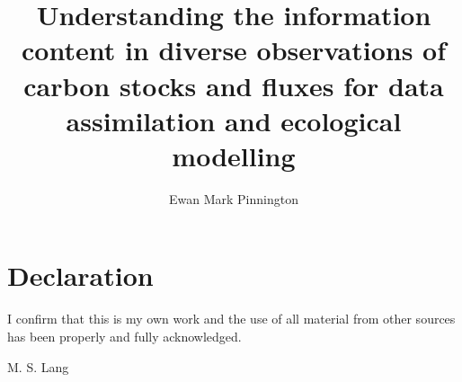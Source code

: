 \documentclass[a4paper,oneside,titlepage,11pt]{report}
\title{\sffamily\bfseries Understanding the information content in diverse observations of carbon stocks and fluxes for data assimilation and ecological modelling}
\author{\sffamily Ewan Mark Pinnington}
\theoremstyle{plain}
\begin{document}
\maketitle
\clearpage

\chapter*{Declaration}

\par
I confirm that this is my own work and the use of all material from
other sources has been properly and fully acknowledged.

\vspace*{1cm}
\hspace{3.75in} M. S. Lang

\newpage


\begin{abstract}
%
\end{abstract}


\thispagestyle{empty}
\clearpage
\thispagestyle{empty}

{\sffamily\tableofcontents}
\clearpage{}
{}
\listoffigures
\clearpage
\thispagestyle{plain}

{}
\listoftables
\clearpage


\clearpage
\end{document}
